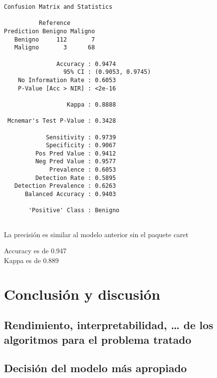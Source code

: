 \documentclass[
]{article}
\begin{document}
\begin{verbatim}
Confusion Matrix and Statistics

          Reference
Prediction Benigno Maligno
   Benigno     112       7
   Maligno       3      68
                                          
               Accuracy : 0.9474          
                 95% CI : (0.9053, 0.9745)
    No Information Rate : 0.6053          
    P-Value [Acc > NIR] : <2e-16          
                                          
                  Kappa : 0.8888          
                                          
 Mcnemar's Test P-Value : 0.3428          
                                          
            Sensitivity : 0.9739          
            Specificity : 0.9067          
         Pos Pred Value : 0.9412          
         Neg Pred Value : 0.9577          
             Prevalence : 0.6053          
         Detection Rate : 0.5895          
   Detection Prevalence : 0.6263          
      Balanced Accuracy : 0.9403          
                                          
       'Positive' Class : Benigno         
                                          
\end{verbatim}

La precisión es similar al modelo anterior sin el paquete caret

Accuracy es de 0.947\\
Kappa es de 0.889

\hypertarget{conclusiuxf3n-y-discusiuxf3n}{%
\section{Conclusión y discusión}\label{conclusiuxf3n-y-discusiuxf3n}}

\hypertarget{rendimiento-interpretabilidad-de-los-algoritmos-para-el-problema-tratado}{%
\subsection{Rendimiento, interpretabilidad, \ldots{} de los algoritmos
para el problema
tratado}\label{rendimiento-interpretabilidad-de-los-algoritmos-para-el-problema-tratado}}

\hypertarget{decisiuxf3n-del-modelo-muxe1s-apropiado}{%
\subsection{Decisión del modelo más
apropiado}\label{decisiuxf3n-del-modelo-muxe1s-apropiado}}
\end{document}
